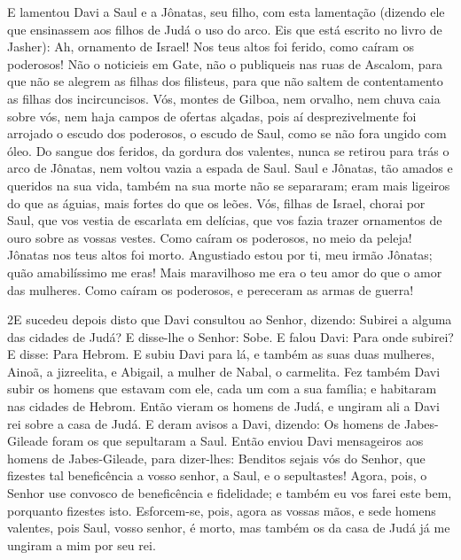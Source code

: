E lamentou Davi a Saul e a Jônatas, seu filho, com esta
lamentação (dizendo ele que ensinassem aos filhos de Judá o
uso do arco. Eis que está escrito no livro de Jasher): Ah,
ornamento de Israel! Nos teus altos foi ferido, como caíram os
poderosos! Não o noticieis em Gate, não o publiqueis nas ruas
de Ascalom, para que não se alegrem as filhas dos filisteus, para
que não saltem de contentamento as filhas dos incircuncisos.
Vós, montes de Gilboa, nem orvalho, nem chuva caia sobre vós,
nem haja campos de ofertas alçadas, pois aí desprezivelmente foi
arrojado o escudo dos poderosos, o escudo de Saul, como se não fora
ungido com óleo. Do sangue dos feridos, da gordura dos
valentes, nunca se retirou para trás o arco de Jônatas, nem voltou
vazia a espada de Saul. Saul e Jônatas, tão amados e queridos
na sua vida, também na sua morte não se separaram; eram mais
ligeiros do que as águias, mais fortes do que os leões. Vós,
filhas de Israel, chorai por Saul, que vos vestia de escarlata em
delícias, que vos fazia trazer ornamentos de ouro sobre as vossas
vestes. Como caíram os poderosos, no meio da peleja! Jônatas
nos teus altos foi morto. Angustiado estou por ti, meu irmão
Jônatas; quão amabilíssimo me eras! Mais maravilhoso me era o teu
amor do que o amor das mulheres. Como caíram os poderosos, e
pereceram as armas de guerra!

\medskip

\lettrine{2} E sucedeu depois disto que Davi consultou ao
Senhor, dizendo: Subirei a alguma das cidades de Judá? E disse-lhe o
Senhor: Sobe. E falou Davi: Para onde subirei? E disse: Para Hebrom.
E subiu Davi para lá, e também as suas duas mulheres, Ainoã, a
jizreelita, e Abigail, a mulher de Nabal, o carmelita. Fez
também Davi subir os homens que estavam com ele, cada um com a sua
família; e habitaram nas cidades de Hebrom. Então vieram os
homens de Judá, e ungiram ali a Davi rei sobre a casa de Judá. E
deram avisos a Davi, dizendo: Os homens de Jabes-Gileade foram os
que sepultaram a Saul. Então enviou Davi mensageiros aos homens
de Jabes-Gileade, para dizer-lhes: Benditos sejais vós do Senhor,
que fizestes tal beneficência a vosso senhor, a Saul, e o
sepultastes! Agora, pois, o Senhor use convosco de beneficência
e fidelidade; e também eu vos farei este bem, porquanto fizestes
isto. Esforcem-se, pois, agora as vossas mãos, e sede homens
valentes, pois Saul, vosso senhor, é morto, mas também os da casa de
Judá já me ungiram a mim por seu rei.

